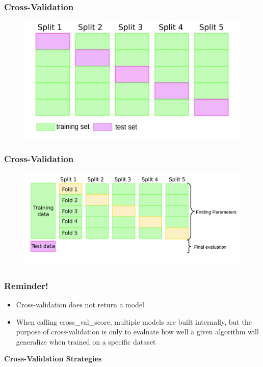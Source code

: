 \documentclass[compress, aspectratio=54]{beamer}
\begin{document}
\begin{frame}
\frametitle{Cross-Validation}
\begin{figure}
\includegraphics[width=0.9\linewidth ]{Figures/cv-5.png}
\end{figure}
\end{frame}


\begin{frame}
\frametitle{Cross-Validation}
\begin{figure}
\includegraphics[width=\linewidth ]{Figures/cv-5-test.png}
\end{figure}
\end{frame}


\begin{frame}
\frametitle{Reminder!}
\begin{itemize}
\item Cross-validation
does not return a model
\item When calling cross\_val\_score, multiple models
are built internally, but the purpose of cross-validation is only to
evaluate how well a given algorithm will generalize when trained on a
specific dataset
\end{itemize}
\end{frame}


 



\begin{frame}
\begin{center}
\Large{\textbf{Cross-Validation Strategies }}
\end{center}
\end{frame}
\end{document}
